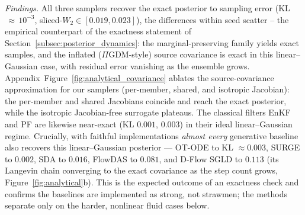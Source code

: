 \emph{Findings.} All three samplers recover the exact posterior to sampling error (KL$\,\approx\,10^{-3}$, sliced-$W_2\in[0.019,0.023]$), the differences within seed scatter -- the empirical counterpart of the exactness statement of Section~\ref{subsec:posterior_dynamics}: the marginal-preserving family yields exact samples, and the inflated ($\Pi$GDM-style) source covariance is exact in this linear--Gaussian case, with residual error vanishing as the ensemble grows. Appendix~Figure~\ref{fig:analytical_covariance} ablates the source-covariance approximation for our samplers (per-member, shared, and isotropic Jacobian): the per-member and shared Jacobians coincide and reach the exact posterior, while the isotropic Jacobian-free surrogate plateaus. The classical filters EnKF and PF are likewise near-exact (KL $0.001$, $0.003$) in their ideal linear--Gaussian regime. Crucially, with faithful implementations \emph{almost every} generative baseline also recovers this linear--Gaussian posterior --- OT-ODE to KL $\approx0.003$, SURGE to $0.002$, SDA to $0.016$, FlowDAS to $0.081$, and D-Flow SGLD to $0.113$ (its Langevin chain converging to the exact covariance as the step count grows, Figure~\ref{fig:analytical}b). This is the expected outcome of an exactness check and confirms the baselines are implemented as strong, not strawmen; the methods separate only on the harder, nonlinear fluid cases below.

